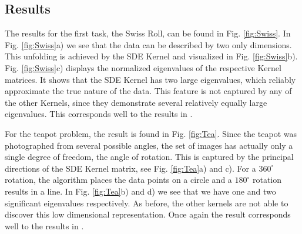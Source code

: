 \documentclass[a4paper,12pt]{article}
\begin{document}
\subsection{Results}

The results for the first task, the Swiss Roll, can be found in Fig. \ref{fig:Swiss}. In Fig. \ref{fig:Swiss}a) we see that the data can be described by two only dimensions. This unfolding is achieved by the SDE Kernel and visualized in Fig. \ref{fig:Swiss}b). Fig. \ref{fig:Swiss}c) displays the normalized eigenvalues of the respective Kernel matrices. It shows that the SDE Kernel has two large eigenvalues, which reliably approximate the true nature of the data. This feature is not captured by any of the other Kernels, since they demonstrate several relatively equally large eigenvalues. This corresponds well to the results in \cite{weinberger04}.

For the teapot problem, the result is found in Fig. \ref{fig:Tea}. Since the teapot was photographed from several possible angles, the set of images has actually only a single degree of freedom, the angle of rotation. This is captured by the principal directions of the SDE Kernel matrix, see  Fig. \ref{fig:Tea}a) and c). For a $360^{\circ}$ rotation, the algorithm places the data points on a circle and a $180^\circ$ rotation results in a line. In Fig. \ref{fig:Tea}b) and d) we see that we have one and two significant eigenvalues respectively. As before, the other kernels are not able to discover this low dimensional representation. Once again the result corresponds well to the results in \cite{weinberger04}.
\end{document}
